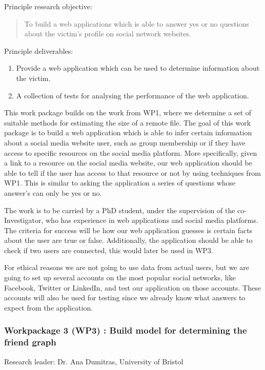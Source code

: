 \documentclass[a4paper,11pt]{article}
\begin{document}
Principle research objective:
\begin{quote}
	To build a web applications which is able to answer yes or no questions about the victim's profile on social network websites.
\end{quote}

Principle deliverables:
\begin{enumerate}
\item Provide a web application which can be used to determine information about the victim.
\item A collection of tests for analysing the performance of the web application.
\end{enumerate}

This work package builds on the work from WP1, where we determine a set of suitable methods for estimating the size of a remote file. The goal of this work package is to build a web application which is able to infer certain information about a social media website user, such as group membership or if they have access to specific resources on the social media platform. More specifically, given a link to a resource on the social media website, our web application should be able to tell if the user has access to that resource or not by using techniques from WP1. This is similar to asking the application a series of questions whose answer's can only be yes or no.

The work is to be carried by a PhD student, under the supervision of the co-Investigator, who has experience in web applications and social media platforms. The criteria for success will be how  our web application guesses is certain facts about the user are true or false. Additionally, the application should be able to check if two users are connected, this would later be used in WP3. 

For ethical reasons we are not going to use data from actual users, but we are going to set up several accounts on the most popular social networks, like Facebook, Twitter or LinkedIn, and test our application on those accounts. These accounts will also be used for testing since we already know what answers to expect from the application.

\subsubsection*{Workpackage 3 (WP3) : Build model for determining the friend graph}
Research leader: Dr. Ana Dumitras, University of Bristol
\end{document}
